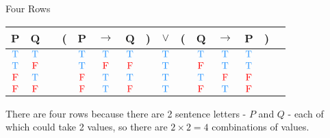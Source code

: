 \documentclass[
  ignorenonframetext,
]{beamer}
\renewcommand{\,}{\text{, }}
\def\True{\textcolor{dodgerblue}{\text{T}}}
\def\False{\textcolor{red}{\text{F}}}
\begin{document}
\begin{frame}{Four Rows}
\protect\hypertarget{four-rows-1}{}

\begin{center}
\begin{tabular}{@{ }c@{ }@{ }c | c@{ }@{}c@{}@{ }c@{ }@{ }c@{ }@{ }c@{ }@{}c@{}@{ }c@{ }@{}c@{}@{ }c@{ }@{ }c@{ }@{ }c@{ }@{}c@{}@{ }c}
P & Q &  & ( & P & $\rightarrow$ & Q & ) & $\lor$ & ( & Q & $\rightarrow$ & P & ) & \\
\hline 
$\True$ & $\True$ &  &  & $\True$ & $\True$ & $\True$ &  & \textcolor{red}{$\True$} &  & $\True$ & $\True$ & $\True$ &  & \\
$\True$ & $\False$ &  &  & $\True$ & $\False$ & $\False$ &  & \textcolor{red}{$\True$} &  & $\False$ & $\True$ & $\True$ &  & \\
$\False$ & $\True$ &  &  & $\False$ & $\True$ & $\True$ &  & \textcolor{red}{$\True$} &  & $\True$ & $\False$ & $\False$ &  & \\
$\False$ & $\False$ &  &  & $\False$ & $\True$ & $\False$ &  & \textcolor{red}{$\True$} &  & $\False$ & $\True$ & $\False$ &  & \\
\end{tabular}
\bigskip
\end{center}

There are four rows because there are 2 sentence letters - \(P\) and
\(Q\) - each of which could take 2 values, so there are
\(2 \times 2 = 4\) combinations of values.

\end{frame}
\end{document}

